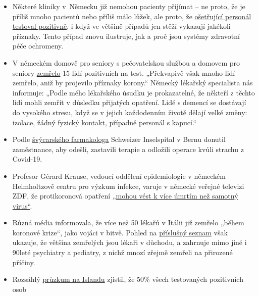 \begin{itemize}
\tightlist
\item
  Některé kliniky v~Německu již nemohou pacienty přijímat -- ne proto,
  že je příliš mnoho pacientů nebo příliš málo lůžek, ale proto, že
  \href{https://web.archive.org/web/20200330082928/https:/www.sueddeutsche.de/panorama/coronavirus-news-deutschland-wolfsburg-laschet-1.4828033}{ošetřující
  personál testoval pozitivně}, i když ve většině případů jen stěží
  vykazují jakékoli příznaky. Tento případ znovu ilustruje, jak a proč
  jsou systémy zdravotní péče ochromeny.
\item
  V německém domově pro seniory s pečovatelskou službou a domovem pro
  seniory
  \href{https://web.archive.org/web/20200330082928/https:/www.sueddeutsche.de/panorama/coronavirus-news-deutschland-wolfsburg-laschet-1.4828033}{zemřelo}
  15 lidí pozitivních na test. „Překvapivě však mnoho lidí zemřelo, aniž
  by projevilo příznaky korony.`` Německý lékařský specialista nás
  informuje: „Podle mého lékařského úsudku je prokazatelné, že někteří z
  těchto lidí mohli zemřít v důsledku přijatých opatření. Lidé s demencí
  se dostávají do vysokého stresu, když se v jejich každodenním životě
  dělají velké změny: izolace, žádný fyzický kontakt, případně personál
  s kapucí.``
\item
  Podle
  \href{https://twitter.com/sneatio/status/1244157986832101376}{švýcarského
  farmakologa} Schweizer Inselspital v Bernu donutil zaměstnance, aby
  odešli, zastavili terapie a odložili operace kvůli strachu z Covid-19.
\item
  Profesor Gérard Krause, vedoucí oddělení epidemiologie v německém
  Helmholtzově centru pro výzkum infekce, varuje v německé veřejné
  televizi ZDF, že protikoronová opatření
  \href{https://www.zdf.de/nachrichten/politik/coronavirus-epidemiologe-folgen-helmholtz-100.html}{„mohou
  vést k více úmrtím než samotný virus``}.
\item
  Různá média informovala, že více než 50 lékařů v Itálii již zemřelo
  „během koronové krize``, jako vojáci v bitvě. Pohled na
  \href{https://portale.fnomceo.it/elenco-dei-medici-caduti-nel-corso-dellepidemia-di-covid-19/}{příslušný
  seznam} však ukazuje, že většina zemřelých jsou lékaři v důchodu, a
  zahrnuje mimo jiné i 90leté psychiatry a pediatry, z nichž mnozí
  zřejmě zemřeli na přirozené příčiny.
\item
  Rozsáhlý
  \href{https://www.buzzfeed.com/albertonardelli/coronavirus-testing-iceland}{průzkum
  na Islandu} zjistil, že 50\% všech testovaných pozitivních osob

\end{itemize}

